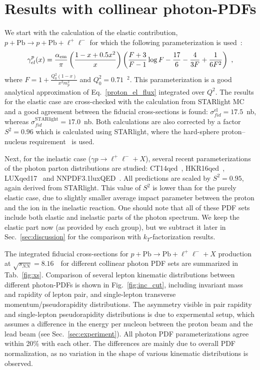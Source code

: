 \section{Results with collinear photon-PDFs}

We start with the calculation of the elastic contribution, $p+\textrm{Pb}\rightarrow p+\textrm{Pb}+ \ell^+\ell^-$
for which the following parameterization is used~\cite{Budnev:1974de}:
\begin{equation} \label{eq:elasticRenat}
\gamma^{p}_{el}(x)  = \frac{\alpha_{\rm em}}{\pi}
\left(
\frac{1-x+0.5x^2}{x}
\right)
\left(
\frac{F+3}{F-1}\log{F}-\frac{17}{6}-\frac{4}{3F}+\frac{1}{6F^2}
\right)~,
\end{equation}
where $F = 1+\frac{Q_0^2(1-x)}{x^2 m_p^2}$ and $Q_0^2 = 0.71$~\GeV$^2$. This parameterization is a good analytical approximation of Eq.~\ref{proton_el_flux} integrated over $Q^2$.
The results for the elastic case are cross-checked with the calculation from STARlight MC and a good agreement between the fiducial cross-sections is found:
$\sigma_{fid}^{\textrm{el}} = 17.5$~nb, whereas $\sigma_{fid}^{\textrm{STARlight}} = 17.0$~nb.
Both calculations are also corrected by a factor $S^2=0.96$ which 
is calculated using STARlight, where the hard-sphere proton--nucleus requirement~\cite{Klein:2016yzr} is used.

Next, for the inelastic case ($\gamma p\rightarrow \ell^+\ell^- + X$), several recent parameterizations of the photon parton distributions are studied: CT14qed~\cite{Schmidt:2015zda}, HKR16qed~\cite{Harland-Lang:2016kog}, LUXqed17~\cite{Manohar:2017eqh} and NNPDF3.1luxQED~\cite{Bertone:2017bme}. 
All predictions are scaled by $S^2=0.95$, again derived from STARlight. This value of $S^2$ is lower than for the purely elastic case, due to slightly smaller average impact parameter between the proton and the ion in the inelastic reaction.
One should note that all of these PDF sets include both elastic and inelastic parts of the photon spectrum.
We keep the elastic part now (as provided by each group), but we subtract it later in Sec.~\ref{sec:discussion} for the comparison with $k_T$-factorization results.

The integrated fiducial cross-sections for $p+\textrm{Pb}\rightarrow \textrm{Pb} + \ell^+\ell^- + X$ production at $\sqrt{s_{N N}} = 8.16$~\TeV\ for different collinear photon PDF sets are summarized in Tab.~\ref{fig:xs}.
Comparison of several lepton kinematic distributions between different photon-PDFs is shown in Fig.~\ref{fig:inc_cut}, including invariant mass and rapidity of lepton pair, and single-lepton transverse momentum/pseudorapidity distributions. 
The asymmetry visible in pair rapidity and single-lepton pseudorapidity distributions is due to expermental setup, which assumes a difference in the energy per nucleon between the proton beam and the lead beam (see Sec.~\ref{sec:experiment}).
All photon PDF parameterizations agree within 20\% with each other.
The differences are mainly due to overall PDF normalization, as no variation in the shape of various kinematic distributions is observed.

